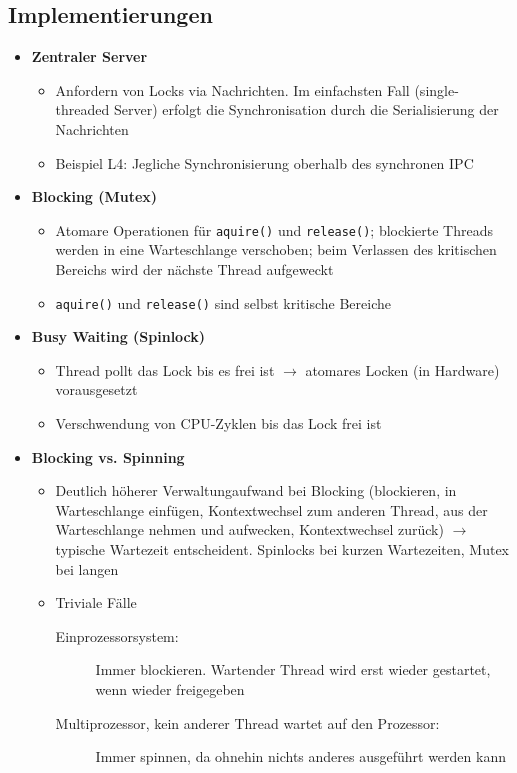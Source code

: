 \subsection{Implementierungen}
\begin{itemize}
	\item \textbf{Zentraler Server}
	\begin{itemize}
		\item Anfordern von Locks via Nachrichten. Im einfachsten Fall (single-threaded Server) erfolgt die Synchronisation durch die Serialisierung der Nachrichten
		\item Beispiel L4: Jegliche Synchronisierung oberhalb des synchronen IPC
	\end{itemize}
	\item \textbf{Blocking (Mutex)}
	\begin{itemize}
		\item Atomare Operationen für \texttt{aquire()} und \texttt{release()}; blockierte Threads werden in eine Warteschlange verschoben; beim Verlassen des kritischen Bereichs wird der nächste Thread aufgeweckt
		\item \texttt{aquire()} und \texttt{release()} sind selbst kritische Bereiche
	\end{itemize}
	\item \textbf{Busy Waiting (Spinlock)}
	\begin{itemize}
		\item Thread pollt das Lock bis es frei ist \(\rightarrow\) atomares Locken (in Hardware) vorausgesetzt
		\item Verschwendung von CPU-Zyklen bis das Lock frei ist
	\end{itemize}
	\item \textbf{Blocking vs. Spinning}
	\begin{itemize}
		\item Deutlich höherer Verwaltungaufwand bei Blocking (blockieren, in Warteschlange einfügen, Kontextwechsel zum anderen Thread, aus der Warteschlange nehmen und aufwecken, Kontextwechsel zurück) \(\rightarrow\) typische Wartezeit entscheident. Spinlocks bei kurzen Wartezeiten, Mutex bei langen
		\item Triviale Fälle
		\begin{description}
			\item[Einprozessorsystem:] Immer blockieren. Wartender Thread wird erst wieder gestartet, wenn wieder freigegeben
			\item[Multiprozessor, kein anderer Thread wartet auf den Prozessor:] Immer spinnen, da ohnehin nichts anderes ausgeführt werden kann

\end{description}
\end{itemize}
\end{itemize}
